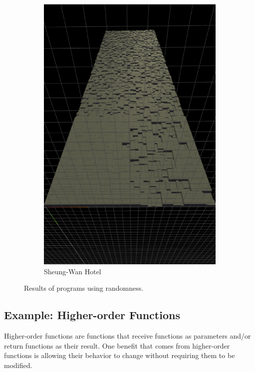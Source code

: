 \begin{figure}
\begin{subfigure}[b]{0.3\linewidth}
    \includegraphics[width=1.0\linewidth]{./images/all_examples/sheung_wan_hotel_crop}
    \caption{Sheung-Wan Hotel}
    \label{fig:ex:sheung:wan}
  \end{subfigure}
  \caption{Results of programs using randomness.}
  \label{fig:rand:progs}
\end{figure}


\subsection{Example: Higher-order Functions}
Higher-order functions are functions that receive functions as parameters and/or return functions as their result.
One benefit that comes from higher-order functions is allowing their behavior to change without requiring them to be modified.

